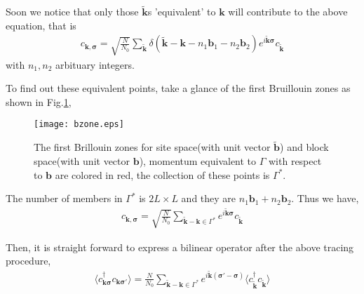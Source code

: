 \documentclass[prb,twocolumn,showpacs,superscriptaddress]{revtex4-1}
\newcommand{\tk}{\tilde{\mathbf{k}}}
\renewcommand{\k}{\mathbf{k}}
\newcommand{\tb}{\tilde{\mathbf{b}}}
\newcommand{\bv}{\mathbf{b}}
\newcommand{\sig}{\mathbf{\sigma}}
\begin{document}
Soon we notice that only those $\tk$s 'equivalent' to $\k$ will contribute to the above equation, that is
\begin{align}
    c_{\k,\sig}=\sqrt{\frac{N}{N_0}}\sum\limits_{\tk}\delta(\tk-\k-n_1\bv_1-n_2\bv_2)e^{i\tk \sig}c_{\tk}
\end{align}
with $n_1,n_2$ arbituary integers.

To find out these equivalent points, take a glance of the first Bruillouin zones as shown in Fig.\ref{bzone},
\begin{figure}
\texttt{[image: bzone.eps]}
\caption{The first Brillouin zones for site space(with unit vector $\tb$) and block space(with unit vector $\bv$),
momentum equivalent to $\Gamma$ with respect to $\bv$ are colored in red, the collection of these points is $\Gamma^*$.}
\label{bzone}
\end{figure}

The number of members in $\Gamma^*$ is $2L\times L$ and they are $n_1\bv_1+n_2\bv_2$.
Thus we have,
\begin{align}
    c_{\k,\sig}=\sqrt{\frac{N}{N_0}}\sum\limits_{\tk-\k\in\Gamma^*}e^{i\tk \sig}c_{\tk}
\end{align}

Then, it is straight forward to express a bilinear operator after the above tracing procedure,
\begin{align}
    \langle c^\dag_{\k\sig} c_{\k\sig'}\rangle=\frac{N}{N_0}\sum\limits_{\tk-\k\in\Gamma^*}e^{i\tk(\sig'-\sig)}\langle c_{\tk}^\dag c_{\tk}\rangle
\end{align}


\end{document}
